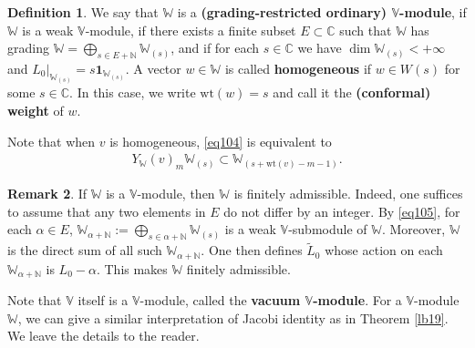 \documentclass[12pt,b5paper,notitlepage]{report}
\theoremstyle{definition}
\newtheorem{df}{Definition}[section]
\newtheorem{rem}[df]{Remark}
\theoremstyle{plain}
\newcommand{\wtd}{\widetilde}
\newcommand{\id}{\mathbf{1}}
\newcommand{\mbb}{\mathbb}
\newcommand{\Vbb}{\mathbb V}
\newcommand{\Wbb}{\mathbb W}
\newcommand{\Cbb}{\mathbb C}
\newcommand{\Nbb}{\mathbb N}
\newcommand{\wt}{\mathrm{wt}}
\numberwithin{equation}{section}
\begin{document}
\begin{df}
We say that $\Wbb$ is a \textbf{(grading-restricted ordinary) $\Vbb$-module}, if $\Wbb$ is a weak $\Vbb$-module, if there exists a finite subset $E\subset\Cbb$ such that  $\Wbb$ has grading $\Wbb=\bigoplus_{s\in E+\Nbb}\Wbb_{(s)}$,  and if for each $s\in\mbb C$ we have $\dim \Wbb_{(s)}<+\infty$ and $L_0|_{\Wbb_{(s)}}=s\id_{\Wbb_{(s)}}$. \index{Wn@$\Wbb(n),\Wbb_{(n)}$}  A vector $w\in\Wbb$ is called \textbf{homogeneous} if $w\in W(s)$ for some $s\in \mbb C$. In this case, we write $\wt(w)=s$ \index{wt@$\wt(v),\wt(w),\wtd\wt(w)$} and call it the \textbf{(conformal) weight} of $w$. 
\end{df}
Note that when $v$ is homogeneous, \eqref{eq104} is equivalent to
\begin{align}
Y_\Wbb(v)_m\Wbb_{(s)}\subset \Wbb_{(s+\wt(v)-m-1)}.\label{eq105}
\end{align}

\begin{rem}\label{lb137}
If $\Wbb$ is a $\Vbb$-module, then $\Wbb$ is finitely admissible. Indeed, one suffices to assume that any two elements in $E$ do not differ by an integer.   By \eqref{eq105}, for each $\alpha\in E$, $\Wbb_{\alpha+\Nbb}:=\bigoplus_{s\in\alpha+\Nbb}\Wbb_{(s)}$ is a weak $\Vbb$-submodule of $\Wbb$. Moreover, $\Wbb$ is the direct sum of all such $\Wbb_{\alpha+\Nbb}$. One then defines $\wtd L_0$ whose action on each $\Wbb_{\alpha+\Nbb}$ is $L_0-\alpha$. This makes $\Wbb$ finitely admissible. 
\end{rem}





Note that $\Vbb$ itself is a $\Vbb$-module, called the \textbf{vacuum $\Vbb$-module}. For a $\Vbb$-module $\Wbb$, we can give a similar interpretation of Jacobi identity as in Theorem \ref{lb19}. We leave the details to the reader. 
\end{document}
